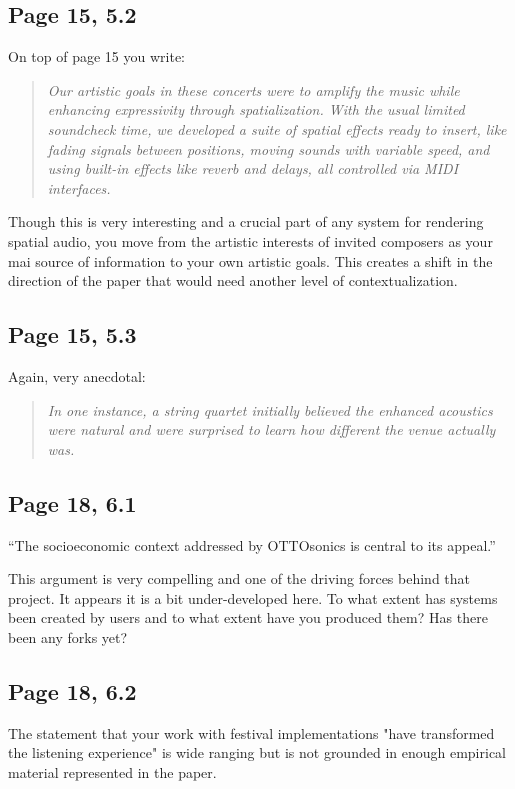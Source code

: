 \documentclass[11pt]{article}
\begin{document}
\subsection*{Page 15, 5.2}
\label{sec:orgc72724d}
On top of page 15 you write:
\begin{quote}
\emph{Our artistic goals in these concerts were to amplify the music while enhancing expressivity
through spatialization. With the usual limited soundcheck time, we developed a suite of
spatial effects ready to insert, like fading signals between positions, moving sounds with
variable speed, and using built-in effects like reverb and delays, all controlled via MIDI
interfaces.}
\end{quote}
Though this is very interesting and a crucial part of any system for rendering spatial audio, you move from the artistic interests of invited composers as your mai source of information to your own artistic goals. This creates a shift in the direction of the paper that would need another level of contextualization.
\subsection*{Page 15, 5.3}
\label{sec:orgc0d2a35}
Again, very anecdotal:

\begin{quote}
\emph{In one instance, a string quartet initially
believed the enhanced acoustics were natural and were surprised to learn how different the
venue actually was.}
\end{quote}
\subsection*{Page 18, 6.1}
\label{sec:org295f8e2}
``The socioeconomic context addressed by OTTOsonics is central to its appeal.''

This argument is very compelling and one of the driving forces behind that project. It appears it is a bit under-developed here. To what extent has systems been created by users and to what extent have you produced them? Has there been any forks yet? 
\subsection*{Page 18, 6.2}
\label{sec:orge200288}
The statement that your work with festival implementations "have transformed the listening experience" is wide ranging but is not grounded in enough empirical material represented in the paper.
\end{document}
